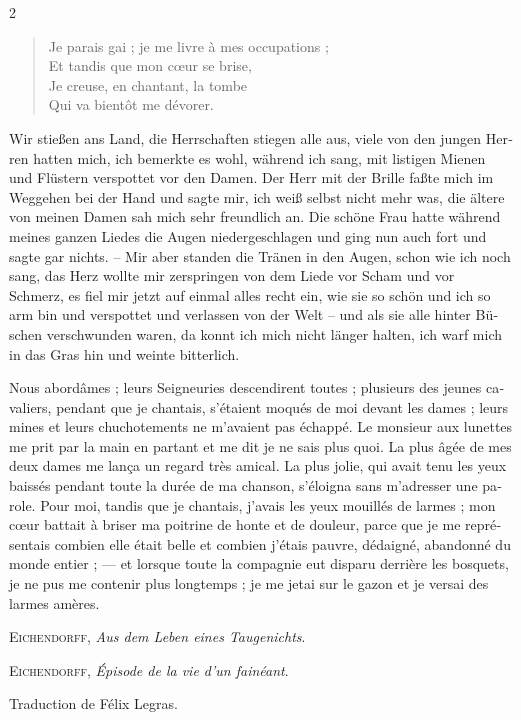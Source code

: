 \documentclass[a4paper,11pt]{article}
\newcommand\chunks[2]{%
\begin{leftcolumn*}\begin{otherlanguage}{german}%
{#1}%
\end{otherlanguage}\end{leftcolumn*}%
\begin{rightcolumn}\begin{otherlanguage}{french}%
{#2}%
\end{otherlanguage}\end{rightcolumn}%
}
\begin{document}
\begin{paracol}{2}
{\begin{verse}
Je parais gai ; je me livre à mes occupations ;\\
Et tandis que mon cœur se brise,\\
Je creuse, en chantant, la tombe\\
Qui va bientôt me dévorer.
\end{verse}}
  \chunks{Wir stießen ans Land, die Herrschaften stiegen alle aus, viele von den jungen Herren hatten mich, ich bemerkte es wohl, während ich sang, mit listigen Mienen und Flüstern verspottet vor den Damen. Der Herr mit der Brille faßte mich im Weggehen bei der Hand und sagte mir, ich weiß selbst nicht mehr was, die ältere von meinen Damen sah mich sehr freundlich an. Die schöne Frau hatte während meines ganzen Liedes die Augen niedergeschlagen und ging nun auch fort und sagte gar nichts. – Mir aber standen die Tränen in den Augen, schon wie ich noch sang, das Herz wollte mir zerspringen von dem Liede vor Scham und vor Schmerz, es fiel mir jetzt auf einmal alles recht ein, wie sie so schön und ich so arm bin und verspottet und verlassen von der Welt – und als sie alle hinter Büschen verschwunden waren, da konnt ich mich nicht länger halten, ich warf mich in das Gras hin und weinte bitterlich.}
         {Nous abordâmes ; leurs Seigneuries descendirent toutes ; plusieurs des jeunes cavaliers, pendant que je chantais, s’étaient moqués de moi devant les dames ; leurs mines et leurs chuchotements ne m’avaient pas échappé. Le monsieur aux lunettes me prit par la main en partant et me dit je ne sais plus quoi. La plus âgée de mes deux dames me lança un regard très amical. La plus jolie, qui avait tenu les yeux baissés pendant toute la durée de ma chanson, s’éloigna sans m’adresser une parole. Pour moi, tandis que je chantais, j’avais les yeux mouillés de larmes ; mon cœur battait à briser ma poitrine de honte et de douleur, parce que je me représentais combien elle était belle et combien j’étais pauvre, dédaigné, abandonné du monde entier ; --- et lorsque toute la compagnie eut disparu derrière les bosquets, je ne pus me contenir plus longtemps ; je me jetai sur le gazon et je versai des larmes amères.}

  \chunks{\begin{flushright}
          \large\textsc{Eichendorff}, \textit{Aus dem Leben eines Taugenichts}.
          \end{flushright}}
         {\begin{flushright}
          \large\textsc{Eichendorff}, \textit{Épisode de la vie d’un fainéant}.\par
          \normalsize Traduction de Félix Legras.
          \end{flushright}}

\end{paracol}
\end{document}
